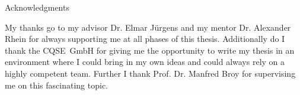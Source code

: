 \thispagestyle{empty}

\vspace*{20mm}

\begin{center}
{ Acknowledgments}
\end{center}

\vspace{10mm}

My thanks go to my advisor Dr. Elmar Jürgens and my mentor Dr. Alexander Rhein for always supporting me at all phases of this thesis. Additionally do I thank the CQSE~GmbH for giving me the opportunity to write my thesis in an environment where I could bring in my own ideas and could always rely on a highly competent team. Further I thank Prof. Dr. Manfred Broy for supervising me on this fascinating topic.

\cleardoublepage{}

